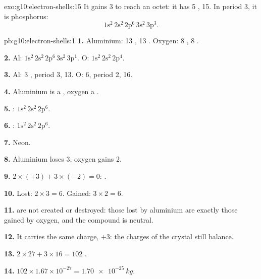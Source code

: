 \begin{solution}{exo:g10:electron-shells:15}
It gains 3  to reach an octet: it has 5 , 
15. In period 3, it is phosphorus:
\[ 1\mathrm{s}^2\,2\mathrm{s}^2\,2\mathrm{p}^6\,3\mathrm{s}^2\,3\mathrm{p}^3. \]
\end{solution}

\begin{solution}{pb:g10:electron-shells:1}
\textbf{1.} Aluminium: 13 , 13 . Oxygen: 8 , 8
.

\textbf{2.} Al: $1\mathrm{s}^2\,2\mathrm{s}^2\,2\mathrm{p}^6\,3\mathrm{s}^2\,3\mathrm{p}^1$.
O: $1\mathrm{s}^2\,2\mathrm{s}^2\,2\mathrm{p}^4$.

\textbf{3.} Al: 3 , period 3,  13. O: 6, period 2,
 16.

\textbf{4.} Aluminium is a , oxygen a .

\textbf{5.} : $1\mathrm{s}^2\,2\mathrm{s}^2\,2\mathrm{p}^6$.

\textbf{6.} : $1\mathrm{s}^2\,2\mathrm{s}^2\,2\mathrm{p}^6$.

\textbf{7.} Neon.

\textbf{8.} Aluminium loses 3, oxygen gains 2.

\textbf{9.} $2 \times (+3) + 3 \times (-2) = 0$: .

\textbf{10.} Lost: $2 \times 3 = 6$. Gained: $3 \times 2 = 6$.

\textbf{11.}  are not created or destroyed: those lost by
aluminium are exactly those gained by oxygen, and the compound is
neutral.

\textbf{12.} It carries the same charge, $+3$: the charges of the crystal
still balance.

\textbf{13.} $2 \times 27 + 3 \times 16 = 102$ .

\textbf{14.} $102 \times 1.67 \times 10^{-27} = \qty{1.70e-25}{kg}$.


\end{solution}
